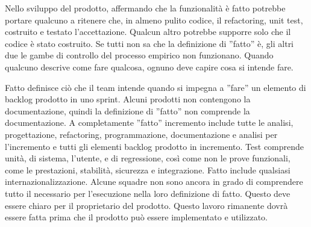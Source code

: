
Nello sviluppo del prodotto, affermando che la funzionalit\`a \`e fatto potrebbe portare qualcuno a ritenere che, in
almeno pulito codice, il refactoring, unit test, costruito e testato l'accettazione. Qualcun altro potrebbe supporre
solo che il codice \`e stato costruito. Se tutti non sa che la definizione di ''fatto'' \`e, gli altri due le gambe di
controllo del processo empirico non funzionano. Quando qualcuno descrive come fare qualcosa, ognuno deve capire cosa si
intende fare.\\
\linebreak

Fatto definisce ci\`o che il team intende quando si impegna a ''fare'' un elemento di backlog prodotto in uno sprint.
Alcuni prodotti non contengono la documentazione, quindi la definizione di ''fatto'' non comprende la documentazione. A
completamente ''fatto'' incremento include tutte le analisi, progettazione, refactoring, programmazione, documentazione
e analisi per l'incremento e tutti gli elementi backlog prodotto in incremento. Test comprende unit\`a, di sistema,
l'utente, e di regressione, così come non le prove funzionali, come le prestazioni, stabilit\`a, sicurezza e
integrazione. Fatto include qualsiasi internazionalizzazione. Alcune squadre non sono ancora in grado di comprendere
tutto il necessario per l'esecuzione nella loro definizione di fatto. Questo deve essere chiaro per il proprietario del
prodotto. Questo lavoro rimanente dovr\`a essere fatta prima che il prodotto pu\`o essere implementato e utilizzato.